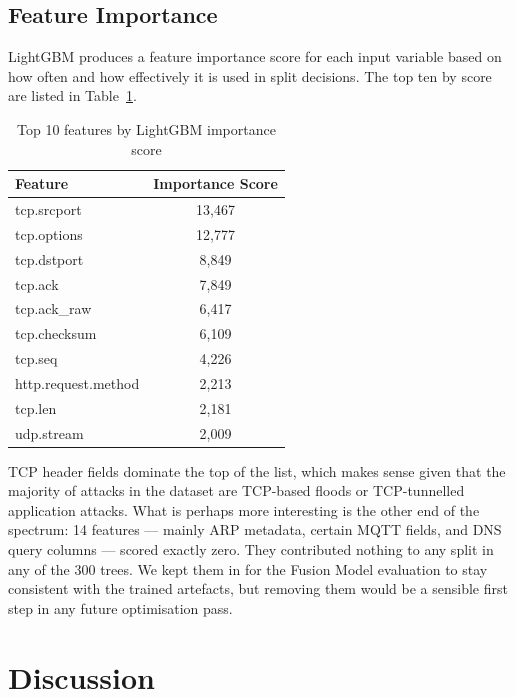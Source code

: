 \documentclass[12pt,a4paper]{report}
\begin{document}
\section{Feature Importance}

LightGBM produces a feature importance score for each input variable based on
how often and how effectively it is used in split decisions. The top ten by
score are listed in Table~\ref{tab:feature_importance}.

\begin{table}[H]
\centering
\caption{Top 10 features by LightGBM importance score}
\label{tab:feature_importance}
\begin{tabular}{lc}
\toprule
\textbf{Feature} & \textbf{Importance Score} \\
\midrule
tcp.srcport         & 13,467 \\
tcp.options         & 12,777 \\
tcp.dstport         &  8,849 \\
tcp.ack             &  7,849 \\
tcp.ack\_raw        &  6,417 \\
tcp.checksum        &  6,109 \\
tcp.seq             &  4,226 \\
http.request.method &  2,213 \\
tcp.len             &  2,181 \\
udp.stream          &  2,009 \\
\bottomrule
\end{tabular}
\end{table}

\noindent TCP header fields dominate the top of the list, which makes sense
given that the majority of attacks in the dataset are TCP-based floods or
TCP-tunnelled application attacks. What is perhaps more interesting is the
other end of the spectrum: 14 features — mainly ARP metadata, certain MQTT
fields, and DNS query columns — scored exactly zero. They contributed nothing
to any split in any of the 300 trees. We kept them in for the Fusion Model
evaluation to stay consistent with the trained artefacts, but removing them
would be a sensible first step in any future optimisation pass.



\chapter{Discussion}
\end{document}
